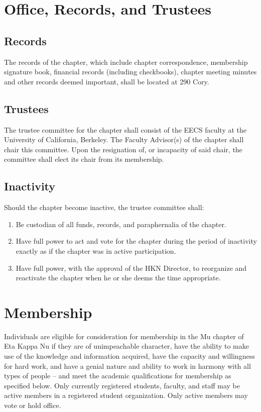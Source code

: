 \documentclass[11pt]{article}
\begin{document}
\section{Office, Records, and Trustees}
\label{sec:org56bff48}

\subsection{Records}
\label{sec:org7a2aadf}

The records of the chapter, which include chapter correspondence, membership signature book, financial records (including checkbooks), chapter meeting minutes and other records deemed important, shall be located at 290 Cory.

\subsection{Trustees}
\label{sec:orgdff4fb1}

The trustee committee for the chapter shall consist of the EECS faculty at the University of California, Berkeley.
The Faculty Advisor(s) of the chapter shall chair this committee.
Upon the resignation of, or incapacity of said chair, the committee shall elect its chair from its membership.

\subsection{Inactivity}
\label{sec:org26ad201}

Should the chapter become inactive, the trustee committee shall:

\begin{enumerate}
\item Be custodian of all funds, records, and paraphernalia of the chapter.
\item Have full power to act and vote for the chapter during the period of inactivity exactly as if the chapter was in active participation.
\item Have full power, with the approval of the HKN Director, to reorganize and reactivate the chapter when he or she deems the time appropriate.
\end{enumerate}
\section{Membership}
\label{sec:org2a58553}

Individuals are eligible for consideration for membership in the Mu chapter of Eta Kappa Nu if they are of unimpeachable character, have the ability to make use of the knowledge and information acquired, have the capacity and willingness for hard work, and have a genial nature and ability to work in harmony with all types of people – and meet the academic qualifications for membership as specified below.
Only currently registered students, faculty, and staff may be active members in a registered student organization.
Only active members may vote or hold office.
\end{document}

